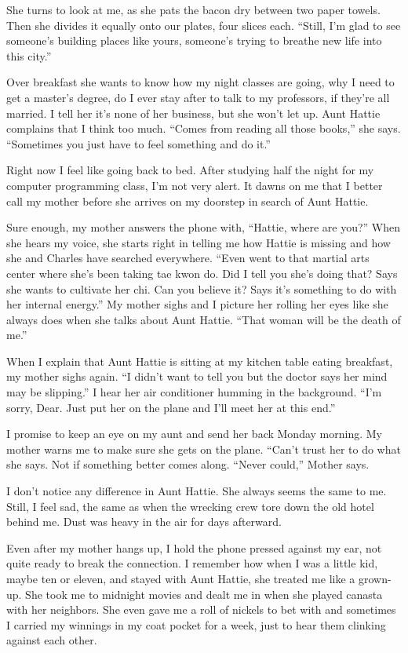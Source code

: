 \documentclass[
]{article}
\begin{document}
She turns to look at me, as she pats the bacon dry between two paper
towels. Then she divides it equally onto our plates, four slices each.
``Still, I'm glad to see someone's building places like yours, someone's
trying to breathe new life into this city.''

Over breakfast she wants to know how my night classes are going, why I
need to get a master's degree, do I ever stay after to talk to my
professors, if they're all married. I tell her it's none of her
business, but she won't let up. Aunt Hattie complains that I think too
much. ``Comes from reading all those books,'' she says. ``Sometimes you
just have to feel something and do it.''

Right now I feel like going back to bed. After studying half the night
for my computer program­ming class, I'm not very alert. It dawns on me
that I better call my mother before she arrives on my doorstep in search
of Aunt Hattie.

Sure enough, my mother answers the phone with, ``Hattie, where are
you?'' When she hears my voice, she starts right in telling me how
Hattie is missing and how she and Charles have searched everywhere.
``Even went to that martial arts center where she's been taking tae kwon
do. Did I tell you she's doing that? Says she wants to cultivate her
chi. Can you believe it? Says it's something to do with her internal
energy.'' My mother sighs and I picture her rolling her eyes like she
always does when she talks about Aunt Hattie. ``That woman will be the
death of me.''

When I explain that Aunt Hattie is sitting at my kitchen table eating
breakfast, my mother sighs again. ``I didn't want to tell you but the
doctor says her mind may be slipping.'' I hear her air condi­tioner
humming in the background. ``I'm sorry, Dear. Just put her on the plane
and I'll meet her at this end.''

I promise to keep an eye on my aunt and send her back Monday morning. My
mother warns me to make sure she gets on the plane. ``Can't trust her to
do what she says. Not if something better comes along. ``Never could,''
Mother says.

I don't notice any difference in Aunt Hattie. She always seems the same
to me. Still, I feel sad, the same as when the wrecking crew tore down
the old hotel behind me. Dust was heavy in the air for days afterward.

Even after my mother hangs up, I hold the phone pressed against my ear,
not quite ready to break the connection. I remember how when I was a
little kid, maybe ten or eleven, and stayed with Aunt Hattie, she
treated me like a grown-up. She took me to midnight movies and dealt me
in when she played canasta with her neighbors. She even gave me a roll
of nickels to bet with and sometimes I carried my winnings in my coat
pocket for a week, just to hear them clinking against each other.
\end{document}
